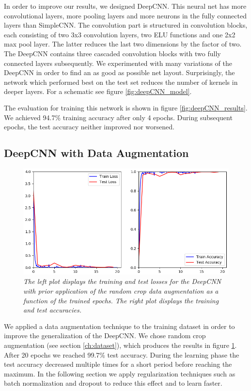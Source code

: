\documentclass[a4paper]{article}
\begin{document}
In order to improve our results, we designed DeepCNN. This neural net has more convolutional layers, more pooling layers and more neurons in the fully connected layers than SimpleCNN. The convolution part is structured in convolution blocks, each consisting of two 3x3 convolution layers, two ELU functions and one 2x2 max pool layer. The latter reduces the last two dimensions by the factor of two. The DeepCNN contains three cascaded convolution blocks with two fully connected layers subsequently. We experimented with many variations of the DeepCNN in order to find an as good as possible net layout. Surprisingly, the network which performed best on the test set reduces the number of kernels in deeper layers. For a schematic see figure \ref{fig:deepCNN_model}. 

The evaluation for training this network is shown in figure \ref{fig:deepCNN_results}. We achieved 94.7\% training accuracy after only 4 epochs. During subsequent epochs, the test accuracy neither improved nor worsened. 

\subsection{DeepCNN with Data Augmentation}\label{sec:deepCNN_augmented}

\begin{figure}
     \centering
     \includegraphics[height=0.25\paperwidth]{graphics/nets/CNN13_with_Augmentation_Results}
     \caption{\textit{The left plot displays the training and test losses for the DeepCNN with prior application of the random crop data augmentation as a function of the trained epochs. The right plot displays the training and test accuracies.}}
     \label{fig:deepCNN_augmented}
\end{figure}

We applied a data augmentation technique to the training dataset in order to improve the generalization of the DeepCNN. We chose random crop augmentation (see section \ref{ch:dataset}), which produces the results in figure \ref{fig:deepCNN_augmented}. After 20 epochs we reached 99.7\% test accuracy. During the learning phase the test accuracy decreased multiple times for a short period before reaching the maximum. In the following section we apply regularization techniques such as batch normalization and dropout to reduce this effect and to learn faster. 
\end{document}
